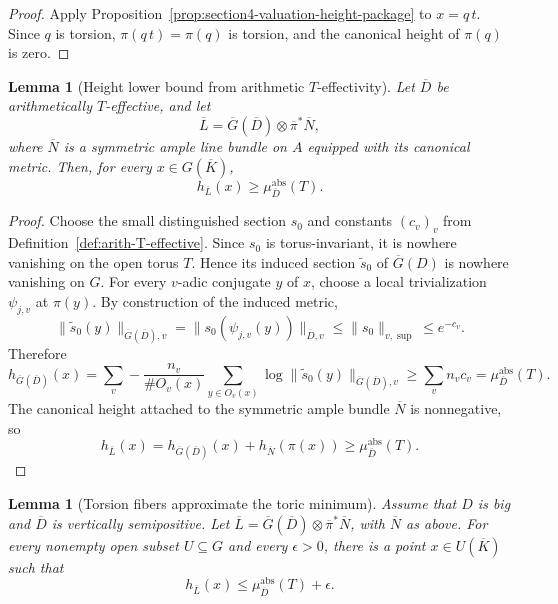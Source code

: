 \documentclass[10pt,a4paper]{amsart}
\theoremstyle{plain}
\newtheorem{lemma}[theorem]{Lemma}
\theoremstyle{plain}
\numberwithin{equation}{section}
\providecommand{\bD}{\overline{D}}
\providecommand{\bL}{\overline{L}}
\providecommand{\bN}{\overline{N}}
\providecommand{\muabs}{\mu^{\mathrm{abs}}}
\begin{document}
\begin{proof}
	Apply Proposition~\ref{prop:section4-valuation-height-package} to
	\(x=q\,t\).  Since \(q\) is torsion, \(\pi(q\,t)=\pi(q)\) is torsion, and the
	canonical height of \(\pi(q)\) is zero.
\end{proof}

\begin{lemma}[Height lower bound from arithmetic \(T\)-effectivity]
	\label{lem:arith-teff-height-lower}
	Let \(\bD\) be arithmetically \(T\)-effective, and let
	\[
	\bL=\overline G(\bD)\otimes\overline\pi^*\bN,
	\]
	where \(\bN\) is a symmetric ample line bundle on \(A\) equipped with its
	canonical metric.  Then, for every \(x\in G(\overline K)\),
	\[
	h_{\bL}(x)\ge \muabs_{\bD}(T).
	\]
\end{lemma}

\begin{proof}
	Choose the small distinguished section \(s_0\) and constants \((c_v)_v\) from
	Definition~\ref{def:arith-T-effective}.  Since \(s_0\) is torus-invariant, it is
	nowhere vanishing on the open torus \(T\).  Hence its induced section
	\(\widetilde s_0\) of \(\overline G(D)\) is nowhere vanishing on \(G\).  For every
	\(v\)-adic conjugate \(y\) of \(x\), choose a local trivialization
	\(\psi_{j,v}\) at \(\pi(y)\).  By construction of the induced metric,
	\[
	\|\widetilde s_0(y)\|_{\overline G(\bD),v}
	=
	\|s_0(\psi_{j,v}(y))\|_{\bD,v}
	\le
	\|s_0\|_{v,\sup}
	\le e^{-c_v}.
	\]
	Therefore
	\[
	h_{\overline G(\bD)}(x)
	=
	\sum_v-\frac{n_v}{\#O_v(x)}
	\sum_{y\in O_v(x)}
	\log\|\widetilde s_0(y)\|_{\overline G(\bD),v}
	\ge
	\sum_v n_vc_v
	=
	\muabs_{\bD}(T).
	\]
	The canonical height attached to the symmetric ample bundle \(\bN\) is
	nonnegative, so
	\[
	h_{\bL}(x)=h_{\overline G(\bD)}(x)+h_{\bN}(\pi(x))
	\ge \muabs_{\bD}(T).
	\]
\end{proof}

\begin{lemma}[Torsion fibers approximate the toric minimum]
	\label{lem:torsion-fiber-toric-min}
	Assume that \(D\) is big and \(\bD\) is vertically semipositive.  Let
	\(\bL=\overline G(\bD)\otimes\overline\pi^*\bN\), with \(\bN\) as above.  For
	every nonempty open subset \(U\subseteq G\) and every \(\epsilon>0\), there is a
	point \(x\in U(\overline K)\) such that
	\[
	h_{\bL}(x)\le \muabs_{\bD}(T)+\epsilon.
	\]
\end{lemma}
\end{document}
